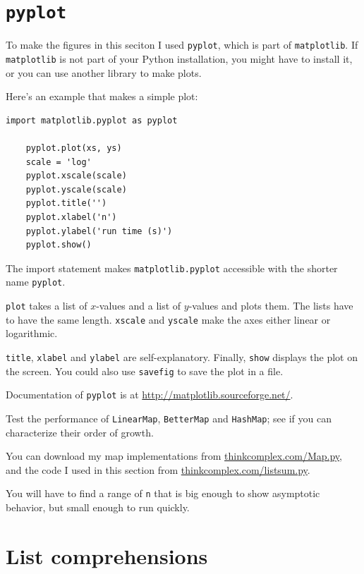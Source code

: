 \documentclass[10pt]{book}
\begin{document}
\section{{\tt pyplot}}
\label{pyplot}

To make the figures in this seciton I used {\tt pyplot}, which is part of
{\tt matplotlib}.  If {\tt matplotlib} is not part of your Python
installation, you might have to install it, or you can use another
library to make plots.

Here's an example that makes a simple plot:

\begin{verbatim}
import matplotlib.pyplot as pyplot

    pyplot.plot(xs, ys)
    scale = 'log'
    pyplot.xscale(scale)
    pyplot.yscale(scale)
    pyplot.title('')
    pyplot.xlabel('n')
    pyplot.ylabel('run time (s)')
    pyplot.show()
\end{verbatim}

The import statement makes {\tt matplotlib.pyplot} accessible
with the shorter name {\tt pyplot}.

{\tt plot} takes a list of $x$-values and a list of $y$-values and
plots them.  The lists have to have the same length.
{\tt xscale} and {\tt yscale} make the axes either linear or logarithmic.

{\tt title}, {\tt xlabel} and {\tt ylabel} are self-explanatory.
Finally, {\tt show} displays the plot on the screen.  You could also
use {\tt savefig} to save the plot in a file.

Documentation of {\tt pyplot} is at \url{http://matplotlib.sourceforge.net/}.


\begin{ex}

Test the performance of
{\tt LinearMap}, {\tt BetterMap} and {\tt HashMap}; see if you
can characterize their order of growth.

You can download my map implementations from
\url{thinkcomplex.com/Map.py}, and the code I used in this section
from \url{thinkcomplex.com/listsum.py}.

You will have to find a range
of {\tt n} that is big enough to show asymptotic behavior, but small
enough to run quickly.

\end{ex}


\section{List comprehensions}
\end{document}
